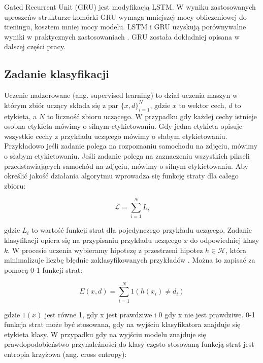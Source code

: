 \documentclass[oneside, mag]{mgr}
\begin{document}
Gated Recurrent Unit (GRU) \cite{DBLP:journals/corr/ChoMGBSB14} jest modyfikacją LSTM. W wyniku zastosowanych uproszeńw strukturze komórki GRU wymaga mniejszej mocy obliczeniowej do treningu, kosztem mniej mocy modelu. LSTM i GRU uzyskują porównywalne wyniki w praktycznych zastosowaniach \cite{DBLP:journals/corr/ChungGCB14}. GRU została dokładniej opisana w dalszej części pracy.

\subsection{Zadanie klasyfikacji}

Uczenie nadzorowane (ang. supervised learning) to dział uczenia maszyn w którym zbiór uczący składa się z par $\{x, d\}_{i=1}^N$, gdzie $x$ to wektor cech, $d$ to etykieta, a $N$ to liczność zbioru uczącego. W przypadku gdy każdej cechy istnieje osobna etykieta mówimy o silnym etykietowaniu. Gdy jedna etykieta opisuje wszystkie cechy z przykładu uczącego mówimy o słabym etykietowaniu. Przykładowo jeśli zadanie polega na rozpoznaniu samochodu na zdjęciu, mówimy o słabym etykietowaniu. Jeśli zadanie polega na zaznaczeniu wszystkich pikseli przedstawiających samochód na zdjęciu, mówimy o silnym etykietowaniu. Aby określić jakość działania algorytmu wprowadza się funkcję straty dla całego zbioru:

\begin{equation}
	\mathcal{L} = \sum_{i=1}^N L_i
\end{equation}

gdzie $L_i$ to wartość funkcji strat dla pojedynczego przykładu uczącego. Zadanie klasyfikacji opiera się na przypisaniu przykładu uczącego $x$ do odpowiedniej klasy $k$. W procesie uczenia wybieramy hipotezę z przestrzeni hipotez $h \in \mathcal{H}$, która minimalizuje liczbę błędnie zaklasyfikowanych przykładów \cite{introduction-to-machine-learning}. Można to zapisać za pomocą 0-1 funkcji strat:

\begin{equation}
	E(x, d) = \sum_{i=1}^N 1(h(x_i) \neq d_i )
\end{equation}

gdzie $1(x)$ jest równe 1, gdy x jest prawdziwe i 0 gdy x nie jest prawdziwe. 0-1 funkcja strat może być stosowana, gdy na wyjściu klasyfikatora znajduje się etykieta klasy. W przypadku gdy na wyjściu modelu znajduje się prawdopodobieństwo przynależności do klasy często stosowaną funkcją strat jest entropia krzyżowa (ang. cross entropy):
\end{document}
